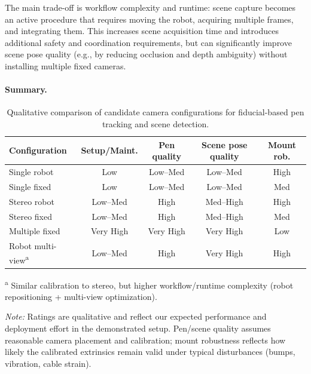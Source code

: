 The main trade-off is workflow complexity and runtime: scene capture becomes an active procedure that requires moving the robot, acquiring multiple frames, and integrating them. This increases scene acquisition time and introduces additional safety and coordination requirements, but can significantly improve scene pose quality (e.g., by reducing occlusion and depth ambiguity) without installing multiple fixed cameras.

\paragraph{Summary.}

\begin{table}[t]
\centering
\caption[Comparison of candidate camera configurations]{%
Qualitative comparison of candidate camera configurations for fiducial-based pen tracking and scene detection.%
}
\label{tab:camera_config_comparison}

\small
\setlength{\tabcolsep}{4pt}
\renewcommand{\arraystretch}{1.1}
\begin{tabular}{l c c c c}
\toprule
Configuration & Setup/Maint. & Pen quality & Scene pose quality & Mount rob. \\
\midrule
Single robot & Low & Low--Med & Low--Med & High \\
Single fixed & Low & Low--Med & Low--Med & Med \\
Stereo robot & Low--Med & High & Med--High & High \\
Stereo fixed & Low--Med & High & Med--High & Med \\
Multiple fixed & Very High & Very High & Very High & Low \\
Robot multi-view\textsuperscript{a} & Low--Med & High & Very High & High \\
\bottomrule
\end{tabular}

\vspace{0.4em}
\footnotesize
\textsuperscript{a} Similar calibration to stereo, but higher workflow/runtime complexity (robot repositioning + multi-view optimization).

\emph{Note:} Ratings are qualitative and reflect our expected performance and deployment effort in the demonstrated setup. Pen/scene quality assumes reasonable camera placement and calibration; mount robustness reflects how likely the calibrated extrinsics remain valid under typical disturbances (bumps, vibration, cable strain).
\end{table}


